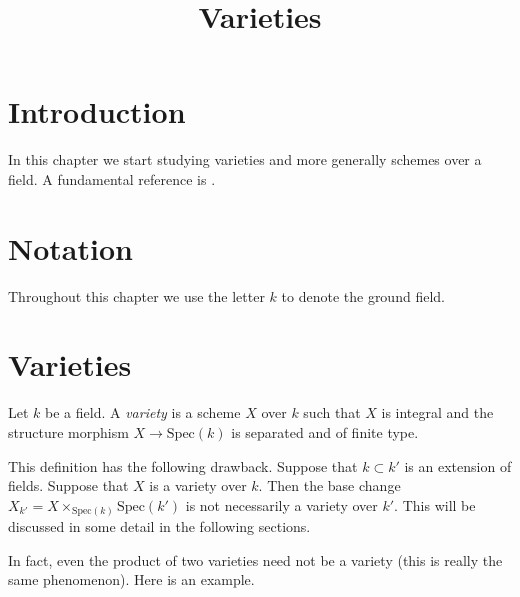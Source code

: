 

%


\title{Varieties}


\maketitle

\label{section-phantom}

\tableofcontents

\section{Introduction}
\label{section-introduction}

\noindent
In this chapter we start studying varieties and more generally
schemes over a field. A fundamental reference is \cite{EGA}.








\section{Notation}
\label{section-notation}

\noindent
Throughout this chapter we use the letter $k$ to denote the ground field.










\section{Varieties}
\label{section-varieties}

\begin{definition}
\label{definition-variety}
Let $k$ be a field. A {\it variety} is a scheme $X$ over $k$
such that $X$ is integral and the structure morphism
$X \to \text{Spec}(k)$ is separated and of finite type.
\end{definition}

\noindent
This definition has the following drawback. Suppose that
$k \subset k'$ is an extension of fields. Suppose that $X$
is a variety over $k$. Then the base change
$X_{k'} = X \times_{\text{Spec}(k)} \text{Spec}(k')$ is
not necessarily a variety over $k'$. This will be discussed
in some detail in the following sections.

\medskip\noindent
In fact, even the product of two varieties need not be a variety
(this is really the same phenomenon). Here is an example.

